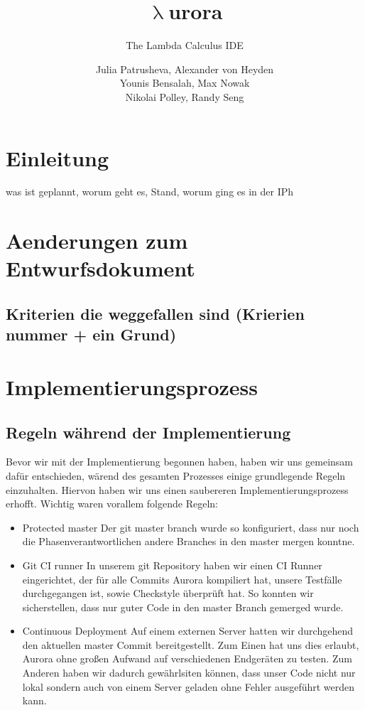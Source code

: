 \documentclass[parskip=full,11pt,twoside]{scrartcl}
\title{\textbf{$\uplambda$}urora}
\subtitle{The Lambda Calculus IDE}
\author{Julia Patrusheva, Alexander von Heyden\\
Younis Bensalah, Max Nowak\\
Nikolai Polley, Randy Seng}
\begin{document}
\maketitle
\tableofcontents
\section{Einleitung}
was ist geplannt, worum geht es, Stand, worum ging es in der IPh
\pagebreak

\section{Aenderungen zum Entwurfsdokument}
\subsection{Kriterien die weggefallen sind (Krierien nummer + ein Grund)}
\pagebreak

\section{Implementierungsprozess}
\subsection{Regeln während der Implementierung}
Bevor wir mit der Implementierung begonnen haben, haben wir uns gemeinsam dafür entschieden, wärend des gesamten Prozesses einige grundlegende Regeln einzuhalten.
Hiervon haben wir uns einen saubereren Implementierungsprozess erhofft.
Wichtig waren vorallem folgende Regeln:
\begin{itemize}
    \item Protected master
        \newline
        Der git master branch wurde so konfiguriert, dass nur noch die Phasenverantwortlichen andere Branches in den master mergen konntne.
    \item Git CI runner
        \newline
        In unserem git Repository haben wir einen CI Runner eingerichtet, der für alle Commits Aurora kompiliert hat, unsere Testfälle durchgegangen ist, sowie Checkstyle überprüft hat.
        So konnten wir sicherstellen, dass nur guter Code in den master Branch gemerged wurde.
    \item Continuous Deployment
        \newline
        Auf einem externen Server hatten wir durchgehend den aktuellen master Commit bereitgestellt.
        Zum Einen hat uns dies erlaubt, Aurora ohne großen Aufwand auf verschiedenen Endgeräten zu testen.
        Zum Anderen haben wir dadurch gewährlsiten können, dass unser Code nicht nur lokal sondern auch von einem Server geladen ohne Fehler ausgeführt werden kann.        
\end{itemize}
\end{document}
